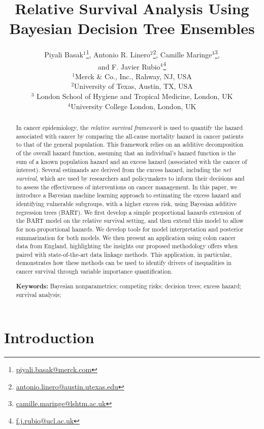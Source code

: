 \documentclass[12pt]{article}
\author{Piyali Basak$^{1}$\thanks{\href{mailto:piyali.basak@merck.com}{piyali.basak@merck.com}}, 
Antonio R. Linero$^{2}$\thanks{\href{mailto:antonio.linero@austin.utexas.edu}{antonio.linero@austin.utexas.edu}},  
Camille Maringe$^{3}$\thanks{\href{mailto:camille.maringe@lshtm.ac.uk}{camille.maringe@lshtm.ac.uk}}, \\ and
F. Javier Rubio$^{4}$\thanks{\href{mailto:f.j.rubio@ucl.ac.uk}{f.j.rubio@ucl.ac.uk}}\\
$^{1}$Merck \& Co., Inc., Rahway, NJ, USA  \\
$^{2}$University of Texas, Austin, TX, USA \\
$^{3}$ London School of Hygiene and Tropical Medicine, London, UK \\
$^{4}$University College London, London, UK}
\begin{document}
\title{Relative Survival Analysis Using \\Bayesian Decision Tree Ensembles}
\date{}
\maketitle

\begin{abstract}
  In cancer epidemiology, the \emph{relative survival framework} is used to quantify the hazard associated with cancer by comparing the all-cause mortality hazard in cancer patients to that of the general population. This framework relies on an additive decomposition of the overall hazard function, assuming that an individual's hazard function is the sum of a known population hazard and an excess hazard (associated with the cancer of interest). Several estimands are derived from the excess hazard, including the \emph{net survival}, which are used by researchers and policymakers to inform their decisions and to assess the effectiveness of interventions on cancer management. In this paper, we introduce a Bayesian machine learning approach to estimating the excess hazard and identifying vulnerable subgroups, with a higher excess risk, using Bayesian additive regression trees (BART). We first develop a simple proportional hazards extension of the BART model on the relative survival setting, and then extend this model to allow for non-proportional hazards.  We develop tools for model interpretation and posterior summarization for both models. We then present an application using colon cancer data from England, highlighting the insights our proposed methodology offers when paired with state-of-the-art data linkage methods. This application, in particular, demonstrates how these methods can be used to identify drivers of inequalities in cancer survival through variable importance quantification.

  \vspace{1em}
  \noindent \textbf{Keywords:} 
  Bayesian nonparametrics;
  competing risks;
  decision trees;
  excess hazard;
  survival analysis;
\end{abstract}

\doublespacing


\section{Introduction}\label{sec:intro}


\end{document}
